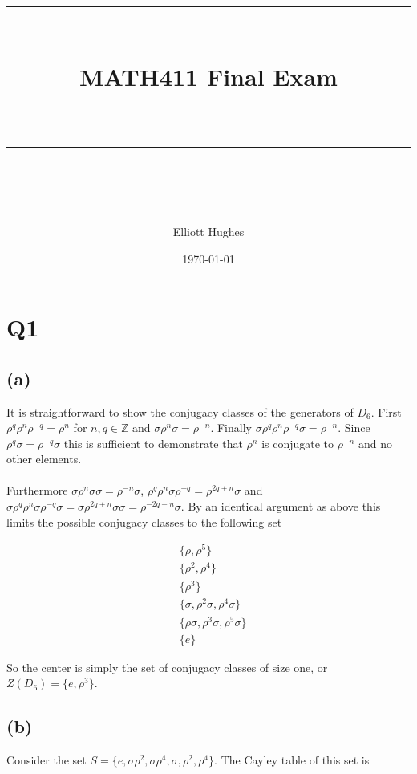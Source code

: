 \documentclass{article}
\title{	
	\normalfont\normalsize 
	\rule{\linewidth}{0.5pt}\\ %
	\vspace{14pt} %
	{\LARGE MATH411 Final Exam\\ %
    \large \textit{} \\}
	\vspace{6pt} %
	\rule{\linewidth}{1pt}\\ %
}
\author{Elliott Hughes}
\date{\normalsize\today}
\begin{document}
\maketitle

\section*{Q1}
\subsection*{(a)}
It is straightforward to show the conjugacy classes of the generators of $D_6$. First 
$\rho^q\rho^n\rho^{-q} = \rho^n$ for $n,q \in \mathbb{Z}$ and $\sigma\rho^n\sigma = \rho^{-n}$. 
Finally $\sigma\rho^q\rho^n\rho^{-q}\sigma = \rho^{-n}$. Since $\rho^q\sigma = \rho^{-q}\sigma$ 
this is sufficient to demonstrate that $\rho^n$ is conjugate to $\rho^{-n}$ and no other elements. 

\paragraph{}
Furthermore $\sigma\rho^n\sigma\sigma = \rho^{-n}\sigma$, $\rho^q\rho^n\sigma\rho^{-q} = \rho^{2q+n}\sigma$ 
and $\sigma\rho^q\rho^n\sigma\rho^{-q}\sigma = \sigma\rho^{2q+n}\sigma\sigma = \rho^{-2q-n}\sigma$. By an 
identical argument as above this limits the possible conjugacy classes to the following set 

\begin{align}
    &\{\rho,\rho^5\} \\
    &\{\rho^2,\rho^4\} \\
    &\{\rho^3\} \\
    &\{\sigma,\rho^2\sigma,\rho^4\sigma\} \\
    &\{\rho\sigma,\rho^3\sigma,\rho^5\sigma\} \\
    &\{e\}
\end{align}

So the center is simply the set of conjugacy classes of size one, or $Z(D_6) = \{e,\rho^3\}$.

\subsection*{(b)}
Consider the set $S = \{e,\sigma\rho^2,\sigma\rho^4,\sigma,\rho^2,\rho^4\}$. The Cayley table of 
this set is 
\end{document}
